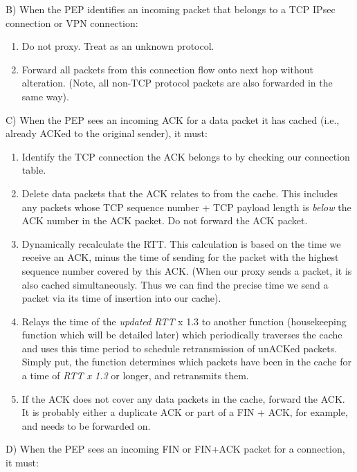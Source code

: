\noindent B) When the PEP identifies an incoming packet that belongs to a TCP IPsec connection or VPN connection:\\

\begin{enumerate}
\item Do not proxy. Treat as an unknown protocol.
\item Forward all packets from this connection flow onto next hop without alteration. (Note, all non-TCP protocol packets are also forwarded in the same way).\\
\end{enumerate}

\noindent C) When the PEP sees an incoming ACK for a data packet it has cached (i.e., already ACKed to the original sender), it must:\\

\begin{enumerate}
\item Identify the TCP connection the ACK belongs to by checking our connection table. 
\item Delete data packets that the ACK relates to from the cache. This includes any packets whose TCP sequence number + TCP payload length is \emph{below} the ACK number in the ACK packet. Do not forward the ACK packet.
\item Dynamically recalculate the RTT. This calculation is based on the time we receive an ACK, minus the time of sending for the packet with the highest sequence number covered by this ACK. (When our proxy sends a packet, it is also cached simultaneously. Thus we can find the precise time we send a packet via its time of insertion into our cache).
\item Relays the time of the \emph{updated RTT} x 1.3 to another function (housekeeping function which will be detailed later) which periodically traverses the cache and uses this time period to schedule retransmission of unACKed packets. Simply put, the function determines which packets have been in the cache for a time of \emph{RTT x 1.3} or longer, and retransmits them.

\item If the ACK does not cover any data packets in the cache, forward the ACK. It is probably either a duplicate ACK or part of a FIN + ACK, for example, and needs to be forwarded on.\\
\end{enumerate}

\noindent D) When the PEP sees an incoming FIN or FIN+ACK packet for a connection, it must:\\

